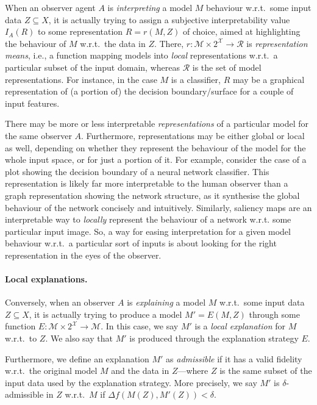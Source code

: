 \documentclass[12pt,a4paper,openright,twoside]{book}
\begin{document}
When an observer agent $A$ is \emph{interpreting} a model $M$ behaviour w.r.t.\ some input data $Z \subseteq X$, it is actually trying to assign a subjective interpretability value $I_A(R)$ to some representation $R = r(M, Z)$ of choice, aimed at highlighting the behaviour of $M$ w.r.t.\ the data in $Z$.
%
There, $r : \mathcal{M} \times 2^\mathcal{X} \rightarrow \mathcal{R}$ is \emph{representation means}, i.e., a function mapping models into \emph{local} representations w.r.t.\ a particular subset of the input domain, whereas $\mathcal{R}$ is the set of model representations.
%
For instance, in the case $M$ is a classifier, $R$ may be a graphical representation of (a portion of) the decision boundary/surface for a couple of input features.

There may be more or less interpretable \emph{representations} of a particular model for the same observer $A$.
%
Furthermore, representations may be either global or local as well, depending on whether they represent the behaviour of the model for the whole input space, or for just a portion of it.
%
For example, consider the case of a plot showing the decision boundary of a neural network classifier.
%
This representation is likely far more interpretable to the human observer than a graph representation showing the network structure, as it synthesise the global behaviour of the network concisely and intuitively.
%
Similarly, saliency maps are an interpretable way to \emph{locally} represent the behaviour of a network w.r.t. some particular input image.
%
So, a way for easing interpretation for a given model behaviour w.r.t.\ a particular sort of inputs is about looking for the right representation in the eyes of the observer.

\paragraph{Local explanations.}    

Conversely, when an observer $A$ is \emph{explaining} a model $M$ w.r.t.\ some input data $Z \subseteq X$, it is actually trying to produce a model $M' = E(M, Z)$ through some function $E: \mathcal{M} \times 2^\mathcal{X} \rightarrow \mathcal{M}$.
%
In this case, we say $M'$ is a \emph{local explanation} for $M$ w.r.t.\ to $Z$.
%
We also say that $M'$ is produced through the explanation strategy $E$.

Furthermore, we define an explanation $M'$ as \emph{admissible} if it has a valid fidelity w.r.t.\ the original model $M$ and the data in $Z$---where $Z$ is the same subset of the input data used by the explanation strategy.
%
More precisely, we say $M'$ is $\delta$-admissible in $Z$ w.r.t.\ $M$ if $\Delta f(M(Z), M'(Z)) < \delta$.
\end{document}
